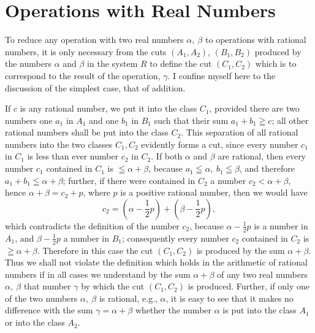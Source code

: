 \documentclass[oneside,12pt]{book}
\begin{document}
\section{Operations with Real Numbers}
To reduce any operation with two real numbers $\alpha,\ \beta$ to operations with rational numbers, it is only necessary from the cuts $(A_1,A_2)$, $(B_1,B_2)$ produced by the numbers $\alpha$ and $\beta$ in the system $R$ to define the cut $(C_1,C_2)$ which is to correspond to the result of the operation, $\gamma$. I confine myself here to the discussion of the simplest case, that of addition. \par 

If $c$ is any rational number, we put it into the class $C_1$, provided there are two numbers one $a_1$ in $A_1$ and one $b_1$ in $B_1$ such that their sum $a_1+b_1\geqq c$; all other rational numbers shall be put into the class $C_2$. This separation of all rational numbers into the two classes $C_1,C_2$ evidently forms a cut, since every number $c_1$ in $C_1$ is less than ever number $c_2$ in $C_2$. If both $\alpha$ and $\beta$ are rational, then every number $c_1$ contained in $C_1$ is $\leqq\alpha+\beta$, because $a_1\leqq\alpha,\ b_1\leqq\beta$, and therefore $a_1+b_1\leqq\alpha+\beta$; further, if there were contained in $C_2$ a number $c_2<\alpha+\beta$, hence $\alpha+\beta=c_2+p$, where $p$ is a positive rational number, then we would have 
\begin{equation*}
    c_2=(\alpha-\frac{1}{2}p)+(\beta-\frac{1}{2}p),
\end{equation*}
which contradicts the definition of the number $c_2$, because $\alpha-\frac{1}{2}p$ is a number in $A_1$, and $\beta-\frac{1}{2}p$ a number in $B_1$; consequently every number $c_2$ contained in $C_2$ is $\geqq\alpha+\beta$. Therefore in this case the cut $(C_1,C_2)$ is produced by the sum $\alpha+\beta$. Thus we shall not violate the definition which holds in the arithmetic of rational numbers if in all cases we understand by the sum $\alpha+\beta$ of any two real numbers $\alpha,\ \beta$ that number $\gamma$ by which the cut $(C_1,C_2)$ is produced. Further, if only one of the two numbers $\alpha,\ \beta$ is rational, e.g., $\alpha$, it is easy to see that it makes no difference with the sum $\gamma=\alpha+\beta$ whether the number $\alpha$ is put into the class $A_1$ or into the class $A_2$. \par 
\end{document}
